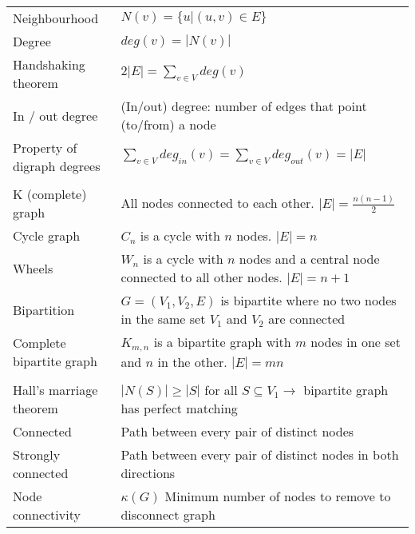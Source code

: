 \documentclass[a4paper,landscape]{article}
\begin{document}
\begin{multicols*}{2}
\begin{tabularx}{\columnwidth}{@{}lX@{}}
        Neighbourhood                    & $N(v) = \{u | (u,v) \in E\}$                                                                             \\
        Degree                           & $deg(v) = |N(v)|$                                                                                        \\
        Handshaking theorem              & $2|E| = \sum_{v \in V} deg(v)$                                                                           \\
        In / out degree                  & (In/out) degree: number of edges that point (to/from) a node                                             \\
        Property of digraph degrees      & $\sum_{v\in V} deg_{in}(v) = \sum_{v\in V} deg_{out}(v) = |E|$                                           \\
        \\
        K (complete) graph               & All nodes connected to each other. $|E| = \frac{n(n-1)}{2}$                                              \\
        Cycle graph                      & $C_n$ is a cycle with $n$ nodes. $|E| = n$                                                               \\
        Wheels                           & $W_n$ is a cycle with $n$ nodes and a central node connected to all other nodes. $|E| = n + 1$           \\
        Bipartition                      & $G = (V_1, V_2, E)$ is bipartite where no two nodes in the same set $V_1$ and $V_2$ are connected        \\
        Complete bipartite graph         & $K_{m,n}$ is a bipartite graph with $m$ nodes in one set and $n$ in the other. $|E| = mn$                \\
        \\
        Hall's marriage theorem          & $|N(S)| \geq |S|$ for all $S \subseteq V_1 \to $ bipartite graph has perfect matching                    \\
        Connected                        & Path between every pair of distinct nodes                                                                \\
        Strongly connected               & Path between every pair of distinct nodes in both directions                                             \\
        Node connectivity                & $\kappa(G)$ Minimum number of nodes to remove to disconnect graph                                        \\

\end{tabularx}
\end{multicols*}
\end{document}
